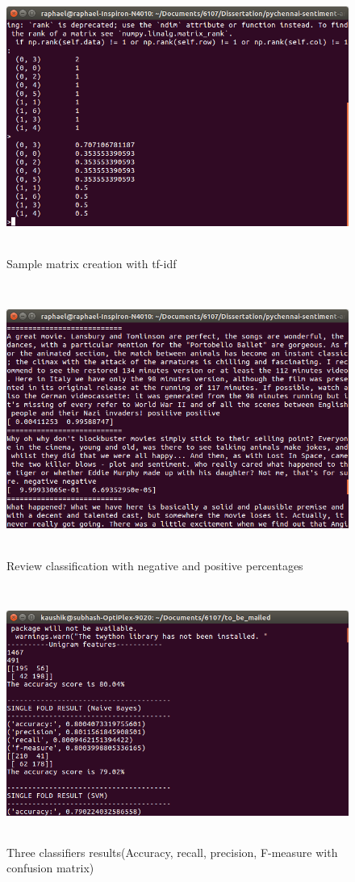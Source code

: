 \documentclass[oneside,a4paper,12pt]{pictreport}
\begin{document}
\begin{figure}[!h]
\includegraphics[width=5.5in,height=3.5in]{screenshot3.png}
\caption{Sample matrix creation with tf-idf}
\end{figure}

\begin{figure}[!h]
\includegraphics[width=5.5in,height=3.5in]{screenshot1.png}
\caption{Review classification with negative and positive percentages}
\end{figure}


\begin{figure}[!h]
\includegraphics[width=5.5in,height=3.3in]{screenshot4.png}
\caption{Three classifiers results(Accuracy, recall, precision, F-measure with confusion matrix)}
\end{figure}
\end{document}
